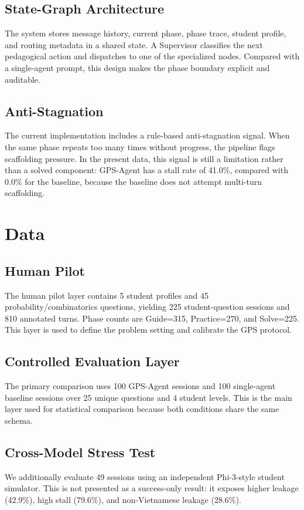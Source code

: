 \documentclass[11pt]{article}
\begin{document}
\subsection{State-Graph Architecture}
The system stores message history, current phase, phase trace, student profile, and routing metadata in a shared state. A Supervisor classifies the next pedagogical action and dispatches to one of the specialized nodes. Compared with a single-agent prompt, this design makes the phase boundary explicit and auditable.

\subsection{Anti-Stagnation}
The current implementation includes a rule-based anti-stagnation signal. When the same phase repeats too many times without progress, the pipeline flags scaffolding pressure. In the present data, this signal is still a limitation rather than a solved component: GPS-Agent has a stall rate of 41.0\%, compared with 0.0\% for the baseline, because the baseline does not attempt multi-turn scaffolding.

\section{Data}
\subsection{Human Pilot}
The human pilot layer contains 5 student profiles and 45 probability/combinatorics questions, yielding 225 student-question sessions and 810 annotated turns. Phase counts are Guide=315, Practice=270, and Solve=225. This layer is used to define the problem setting and calibrate the GPS protocol.

\subsection{Controlled Evaluation Layer}
The primary comparison uses 100 GPS-Agent sessions and 100 single-agent baseline sessions over 25 unique questions and 4 student levels. This is the main layer used for statistical comparison because both conditions share the same schema.

\subsection{Cross-Model Stress Test}
We additionally evaluate 49 sessions using an independent Phi-3-style student simulator. This is not presented as a success-only result: it exposes higher leakage (42.9\%), high stall (79.6\%), and non-Vietnamese leakage (28.6\%).
\end{document}
